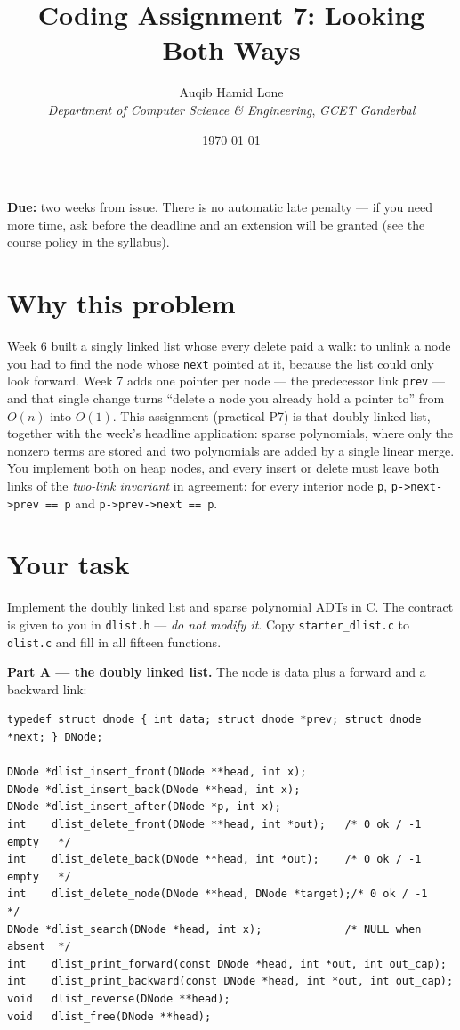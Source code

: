 \documentclass[11pt]{article}
\title{Coding Assignment 7: Looking Both Ways}
\author{Auqib Hamid Lone\\[0.3em]
  \emph{Department of Computer Science \& Engineering}, \emph{GCET Ganderbal}}
\date{\today}
\begin{document}
\maketitle

\noindent\textbf{Due:} two weeks from issue. There is no automatic late penalty --- if you need more time, ask before the deadline and an extension will be granted (see the course policy in the syllabus).

\section{Why this problem}

Week 6 built a singly linked list whose every delete paid a walk: to unlink a node you had to find the node whose \texttt{next} pointed at it, because the list could only look forward. Week 7 adds one pointer per node --- the predecessor link \texttt{prev} --- and that single change turns ``delete a node you already hold a pointer to'' from $O(n)$ into $O(1)$. This assignment (practical P7) is that doubly linked list, together with the week's headline application: sparse polynomials, where only the nonzero terms are stored and two polynomials are added by a single linear merge. You implement both on heap nodes, and every insert or delete must leave both links of the \emph{two-link invariant} in agreement: for every interior node \texttt{p}, \texttt{p->next->prev == p} and \texttt{p->prev->next == p}.

\section{Your task}

Implement the doubly linked list and sparse polynomial ADTs in C. The contract is given to you in \texttt{dlist.h} --- \emph{do not modify it}. Copy \texttt{starter\_dlist.c} to \texttt{dlist.c} and fill in all fifteen functions.

\textbf{Part A --- the doubly linked list.} The node is data plus a forward and a backward link:
\begin{verbatim}
typedef struct dnode { int data; struct dnode *prev; struct dnode *next; } DNode;

DNode *dlist_insert_front(DNode **head, int x);
DNode *dlist_insert_back(DNode **head, int x);
DNode *dlist_insert_after(DNode *p, int x);
int    dlist_delete_front(DNode **head, int *out);   /* 0 ok / -1 empty   */
int    dlist_delete_back(DNode **head, int *out);    /* 0 ok / -1 empty   */
int    dlist_delete_node(DNode **head, DNode *target);/* 0 ok / -1         */
DNode *dlist_search(DNode *head, int x);             /* NULL when absent  */
int    dlist_print_forward(const DNode *head, int *out, int out_cap);
int    dlist_print_backward(const DNode *head, int *out, int out_cap);
void   dlist_reverse(DNode **head);
void   dlist_free(DNode **head);
\end{verbatim}
\end{document}
